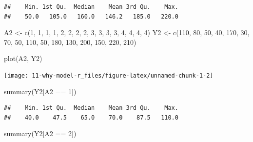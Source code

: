 \documentclass[
  10pt,
]{book}
\newenvironment{Shaded}{\begin{snugshade}}{\end{snugshade}}
\newcommand{\DecValTok}[1]{\textcolor[rgb]{0.00,0.00,0.81}{#1}}
\newcommand{\FunctionTok}[1]{\textcolor[rgb]{0.00,0.00,0.00}{#1}}
\newcommand{\NormalTok}[1]{#1}
\newcommand{\OtherTok}[1]{\textcolor[rgb]{0.56,0.35,0.01}{#1}}
\newcommand{\SpecialCharTok}[1]{\textcolor[rgb]{0.00,0.00,0.00}{#1}}
\begin{document}
\begin{verbatim}
##    Min. 1st Qu.  Median    Mean 3rd Qu.    Max. 
##    50.0   105.0   160.0   146.2   185.0   220.0
\end{verbatim}

\begin{Shaded}
\begin{Highlighting}[]
\NormalTok{A2 }\OtherTok{\textless{}{-}} \FunctionTok{c}\NormalTok{(}\DecValTok{1}\NormalTok{, }\DecValTok{1}\NormalTok{, }\DecValTok{1}\NormalTok{, }\DecValTok{1}\NormalTok{, }\DecValTok{2}\NormalTok{, }\DecValTok{2}\NormalTok{, }\DecValTok{2}\NormalTok{, }\DecValTok{2}\NormalTok{, }\DecValTok{3}\NormalTok{, }\DecValTok{3}\NormalTok{, }\DecValTok{3}\NormalTok{, }\DecValTok{3}\NormalTok{, }\DecValTok{4}\NormalTok{, }\DecValTok{4}\NormalTok{, }\DecValTok{4}\NormalTok{, }\DecValTok{4}\NormalTok{)}
\NormalTok{Y2 }\OtherTok{\textless{}{-}} \FunctionTok{c}\NormalTok{(}\DecValTok{110}\NormalTok{, }\DecValTok{80}\NormalTok{, }\DecValTok{50}\NormalTok{, }\DecValTok{40}\NormalTok{, }\DecValTok{170}\NormalTok{, }\DecValTok{30}\NormalTok{, }\DecValTok{70}\NormalTok{, }\DecValTok{50}\NormalTok{, }\DecValTok{110}\NormalTok{, }\DecValTok{50}\NormalTok{, }\DecValTok{180}\NormalTok{,}
        \DecValTok{130}\NormalTok{, }\DecValTok{200}\NormalTok{, }\DecValTok{150}\NormalTok{, }\DecValTok{220}\NormalTok{, }\DecValTok{210}\NormalTok{)}

\FunctionTok{plot}\NormalTok{(A2, Y2)}
\end{Highlighting}
\end{Shaded}

\begin{center}\texttt{[image: 11-why-model-r\_files/figure-latex/unnamed-chunk-1-2]} \end{center}

\begin{Shaded}
\begin{Highlighting}[]
\FunctionTok{summary}\NormalTok{(Y2[A2 }\SpecialCharTok{==} \DecValTok{1}\NormalTok{])}
\end{Highlighting}
\end{Shaded}

\begin{verbatim}
##    Min. 1st Qu.  Median    Mean 3rd Qu.    Max. 
##    40.0    47.5    65.0    70.0    87.5   110.0
\end{verbatim}

\begin{Shaded}
\begin{Highlighting}[]
\FunctionTok{summary}\NormalTok{(Y2[A2 }\SpecialCharTok{==} \DecValTok{2}\NormalTok{])}
\end{Highlighting}
\end{Shaded}
\end{document}
